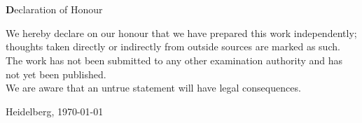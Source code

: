 \thispagestyle{empty}
\newpage
\section*{}
\begin{center}
{\large\textbf Declaration of Honour}
\end{center}

\vspace*{1cm}

\noindent
We hereby declare on our honour that we have prepared this work independently; 
thoughts taken directly or indirectly from outside sources are marked as such. 
The work has not been submitted to any other examination authority and 
has not yet been published.\\

\noindent
We are aware that an untrue statement will have legal consequences.

\vspace{2cm}



\noindent Heidelberg, \today \hspace{4cm}\\
\vspace*{0.5cm}
\hspace*{11.0cm}


